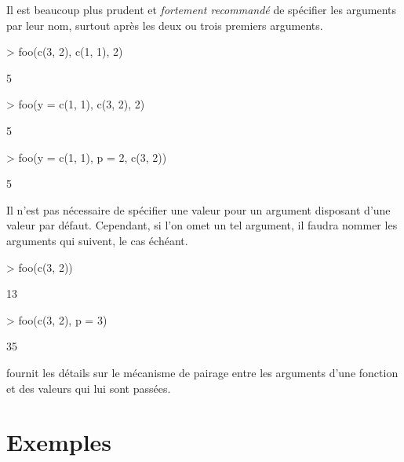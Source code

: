 Il est beaucoup plus prudent et \emph{fortement recommandé} de
spécifier les arguments par leur nom, surtout après les deux ou trois
premiers arguments.
\begin{Schunk}
\begin{Sinput}
> foo(c(3, 2), c(1, 1), 2)
\end{Sinput}
\begin{Soutput}
[1] 5
\end{Soutput}
\begin{Sinput}
> foo(y = c(1, 1), c(3, 2), 2)
\end{Sinput}
\begin{Soutput}
[1] 5
\end{Soutput}
\begin{Sinput}
> foo(y = c(1, 1), p = 2, c(3, 2))
\end{Sinput}
\begin{Soutput}
[1] 5
\end{Soutput}
\end{Schunk}

Il n'est pas nécessaire de spécifier une valeur pour un argument
disposant d'une valeur par défaut. Cependant, si l'on omet un tel
argument, il faudra nommer les arguments qui suivent, le cas échéant.
\begin{Schunk}
\begin{Sinput}
> foo(c(3, 2))
\end{Sinput}
\begin{Soutput}
[1] 13
\end{Soutput}
\begin{Sinput}
> foo(c(3, 2), p = 3)
\end{Sinput}
\begin{Soutput}
[1] 35
\end{Soutput}
\end{Schunk}

\citet[section~4.3.2]{R-lang} fournit les détails sur le mécanisme de
pairage entre les arguments d'une fonction et des valeurs qui lui sont
passées.



\section{Exemples}
\label{sec:premiers:exemples}

\def\scriptfilename{premiers.R}

\scriptfile{\scriptfilename}



